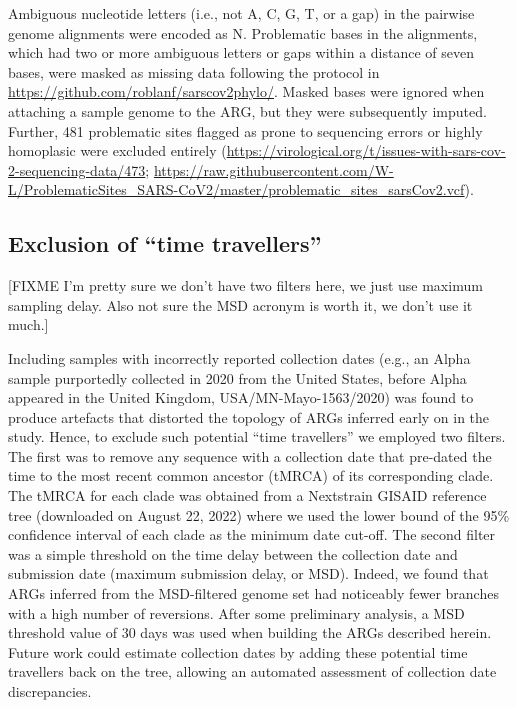\documentclass{article}
\begin{document}
Ambiguous nucleotide letters (i.e.,
not A, C, G, T, or a gap) in the pairwise genome alignments were encoded as N.
Problematic bases in the alignments, which had two or more ambiguous letters or
gaps within a distance of seven bases, were masked as missing data following
the protocol in \url{https://github.com/roblanf/sarscov2phylo/}. Masked bases
were ignored when attaching a sample genome to the ARG, but they were
subsequently imputed. Further, 481 problematic sites flagged as prone to
sequencing errors or highly homoplasic were excluded entirely
(\url{https://virological.org/t/issues-with-sars-cov-2-sequencing-data/473};
\url{https://raw.githubusercontent.com/W-L/ProblematicSites_SARS-CoV2/master/problematic_sites_sarsCov2.vcf}).

\subsection{Exclusion of ``time travellers''}
[FIXME I'm pretty sure we don't have two filters here, we just use
maximum sampling delay. Also not sure the MSD acronym is worth it,
we don't use it much.]

Including samples with incorrectly reported collection dates (e.g., an Alpha
sample purportedly collected in 2020 from the United States, before Alpha
appeared in the United Kingdom, USA/MN-Mayo-1563/2020) was found to produce
artefacts that distorted the topology of ARGs inferred early on in the study.
Hence, to exclude such potential ``time travellers'' we employed two filters.
The first was to remove any sequence with a collection date that pre-dated the
time to the most recent common ancestor (tMRCA) of its corresponding clade. The
tMRCA for each clade was obtained from a Nextstrain GISAID reference tree
(downloaded on August 22, 2022) where we used the lower bound of the 95\%
confidence interval of each clade as the minimum date cut-off. The second
filter was a simple threshold on the time delay between the collection date and
submission date (maximum submission delay, or MSD). Indeed, we found that ARGs
inferred from the MSD-filtered genome set had noticeably fewer branches with a
high number of reversions. After some preliminary analysis, a MSD threshold
value of 30 days was used when building the ARGs described herein. Future work
could estimate collection dates by adding these potential time travellers back
on the tree, allowing an automated assessment of collection date discrepancies.
\end{document}
